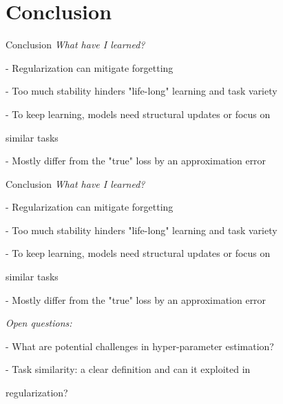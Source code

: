 \documentclass{beamer}
\begin{document}
\section{Conclusion}

\begin{frame}[t]{Conclusion}
	\textit{What have I learned?}
	
	\vspace{0.5cm}
	\quad - Regularization can mitigate forgetting
	
	\vspace{0.25cm}
	\quad - Too much stability hinders "life-long" learning and task variety
	
	\vspace{0.25cm}
	\quad - To keep learning, models need structural updates or focus on 
	
	\quad similar tasks
	
	\vspace{0.25cm}
	\quad - Mostly differ from the "true" loss by an approximation error

\end{frame}

\begin{frame}[t]{Conclusion}
	\textit{What have I learned?}
	
	\vspace{0.5cm}
	\quad - Regularization can mitigate forgetting
	
	\vspace{0.25cm}
	\quad - Too much stability hinders "life-long" learning and task variety
	
	\vspace{0.25cm}
	\quad - To keep learning, models need structural updates or focus on 
	
	\quad similar tasks
	
	\vspace{0.25cm}
	\quad - Mostly differ from the "true" loss by an approximation error
	
	\vspace{0.5cm}
	\textit{Open questions:}
	
	\vspace{0.25cm}
	\quad - What are potential challenges in hyper-parameter estimation?
	
	\vspace{0.25cm}
	\quad - Task similarity: a clear definition and can it exploited in 
	
	\quad regularization?
\end{frame}
\end{document}
